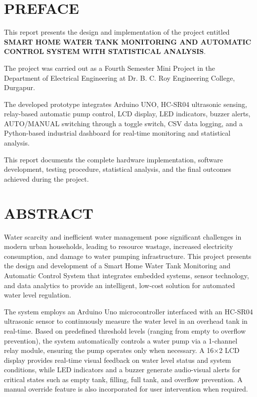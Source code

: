 \documentclass[12pt,a4paper]{article}
\begin{document}
\setcounter{page}{1}

\section*{PREFACE}

This report presents the design and implementation of the project entitled \textbf{SMART HOME WATER TANK MONITORING AND AUTOMATIC CONTROL SYSTEM WITH STATISTICAL ANALYSIS}.

The project was carried out as a Fourth Semester Mini Project in the Department of Electrical Engineering at Dr. B. C. Roy Engineering College, Durgapur.

The developed prototype integrates Arduino UNO, HC-SR04 ultrasonic sensing, relay-based automatic pump control, LCD display, LED indicators, buzzer alerts, AUTO/MANUAL switching through a toggle switch, CSV data logging, and a Python-based industrial dashboard for real-time monitoring and statistical analysis.

This report documents the complete hardware implementation, software development, testing procedure, statistical analysis, and the final outcomes achieved during the project.

\newpage




\section*{ABSTRACT}



Water scarcity and inefficient water management pose significant challenges in modern urban households, leading to resource wastage, increased electricity consumption, and damage to water pumping infrastructure. This project presents the design and development of a Smart Home Water Tank Monitoring and Automatic Control System that integrates embedded systems, sensor technology, and data analytics to provide an intelligent, low-cost solution for automated water level regulation.

The system employs an Arduino Uno microcontroller interfaced with an HC-SR04 ultrasonic sensor to continuously measure the water level in an overhead tank in real-time. Based on predefined threshold levels (ranging from empty to overflow prevention), the system automatically controls a water pump via a 1-channel relay module, ensuring the pump operates only when necessary. A 16×2 LCD display provides real-time visual feedback on water level status and system conditions, while LED indicators and a buzzer generate audio-visual alerts for critical states such as empty tank, filling, full tank, and overflow prevention. A manual override feature is also incorporated for user intervention when required.
\end{document}
